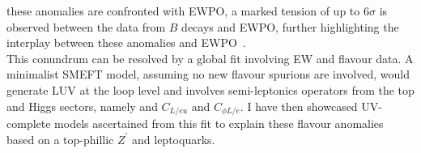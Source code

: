 these anomalies are confronted with EWPO, a marked tension of up to $ 6\sigma$ is observed between the data from $B$ decays and EWPO, further highlighting the interplay between these anomalies and EWPO~\cite{Bhattacharya:2014wla,Feruglio:2016gvd,Celis:2017doq,Buttazzo:2017ixm, Kumar:2018kmr,Ciuchini:2019usw,Aebischer:2019mlg,Cornella:2019hct}.\\ This conundrum can be resolved by a global fit involving EW and flavour data. A minimalist SMEFT model, assuming no new flavour spurions are involved, would generate LUV at the loop level and involves semi-leptonics operators from the top and Higgs sectors, namely and 	$C_{L/eu}$ and  $ C_{\phi L/e}$. I have then showcased UV-complete models ascertained from this fit to explain these flavour anomalies based on a top-phillic $Z^\prime$ and leptoquarks.